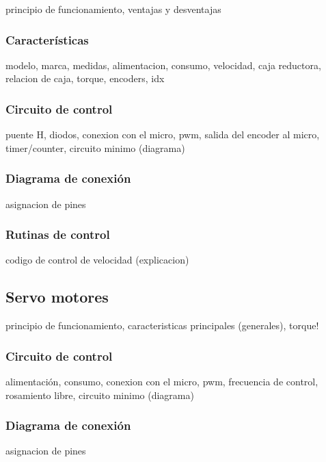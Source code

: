 principio de funcionamiento, ventajas y desventajas

\subsubsection{Caracter\'isticas}
\label{}

modelo, marca, medidas, alimentacion, consumo, velocidad, caja reductora, relacion de caja, torque, encoders, idx

\subsubsection{Circuito de control}
\label{}

puente H, diodos, conexion con el micro, pwm, salida del encoder al micro, timer/counter, circuito minimo (diagrama)

\subsubsection{Diagrama de conexi\'on}
\label{}

asignacion de pines

\subsubsection{Rutinas de control}
\label{}

codigo de control de velocidad (explicacion)

\subsection{Servo motores}
\label{}

principio de funcionamiento, caracteristicas principales (generales), torque!

\subsubsection{Circuito de control}
\label{}

alimentaci\'on, consumo, conexion con el micro, pwm, frecuencia de control, rosamiento libre, circuito minimo (diagrama)

\subsubsection{Diagrama de conexi\'on}
\label{}

asignacion de pines


